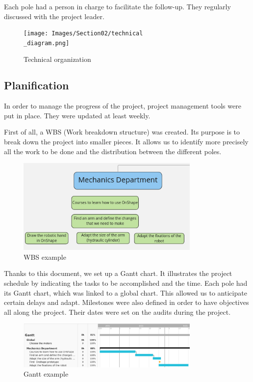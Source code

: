 \bigbreak
Each pole had a person in charge to facilitate the follow-up. They regularly discussed with the project leader.

\begin{figure}[ht]
    \centering
    \texttt{[image: Images/Section02/technical\\\_diagram.png]}
    \caption{Technical organization}
    \label{fig:techOrga}
\end{figure}
\FloatBarrier

\subsection{Planification}

In order to manage the progress of the project, project management tools were put in place. They were updated at least weekly.

\bigbreak
First of all, a WBS (Work breakdown structure) was created. Its purpose is to break down the project into smaller pieces. It allows us to identify more precisely all the work to be done and the distribution between the different poles. 

\begin{figure}[ht]
    \centering
    \includegraphics[width=0.8\textwidth]{Images/Section02/wbs.png}
    \caption{WBS example}
    \label{fig:WBSextract}
\end{figure}
\FloatBarrier

\bigbreak
Thanks to this document, we set up a Gantt chart. It illustrates the project schedule by indicating the tasks to be accomplished and the time. Each pole had its Gantt chart, which was linked to a global chart. This allowed us to anticipate certain delays and adapt. Milestones were also defined in order to have objectives all along the project. Their dates were set on the audits during the project.

\begin{figure}[ht]
    \centering
    \includegraphics[width=0.8\textwidth]{Images/Section02/gantt.png}
    \caption{Gantt example}
    \label{fig:GANTTextract}
\end{figure}
\FloatBarrier

